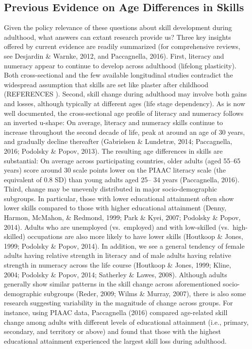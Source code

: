 \documentclass[
  english,
  man]{apa6}
\begin{document}
\hypertarget{previous-evidence-on-age-differences-in-skills}{%
\subsection{Previous Evidence on Age Differences in Skills}\label{previous-evidence-on-age-differences-in-skills}}

Given the policy relevance of these questions about skill development during adulthood, what answers can extant research provide us? Three key insights offered by current evidence are readily summarized (for comprehensive reviews, see Desjardin \& Warnke, 2012, and Paccagnella, 2016). First, literacy and numeracy appear to continue to develop across adulthood (lifelong plasticity). Both cross-sectional and the few available longitudinal studies contradict the widespread assumption that skills are set like plaster after childhood (REFERENCES ). Second, skill change during adulthood may involve both gains and losses, although typically at different ages (life stage dependency). As is now well documented, the cross-sectional age profile of literacy and numeracy follows an inverted u-shape: On average, literacy and numeracy skills continue to increase throughout the second decade of life, peak at around an age of 30 years, and gradually decline thereafter (Gabrielsen \& Lundetræ, 2014; Paccagnella, 2016; Podolsky \& Popov, 2013). The resulting age differences in skills are substantial: On average across participating countries, older adults (aged 55--65 years) score around 30 scale points lower on the PIAAC literacy scale (the equivalent of 0.8 SD) than young adults aged 25-- 34 years (Paccagnella, 2016). Third, change may be unevenly distributed in major socio-demographic subgroups. In particular, those with lower educational attainment often show lower skills compared to those with higher educational attainment (Denny, Harmon, McMahon, \& Redmond, 1999; Park \& Kyei, 2007; Podolsky \& Popov, 2014). Adults who are unemployed (vs.~employed) and with low-skilled (vs.~high-skilled) occupations are also more likely to have lower skills (Houtkoop \& Jones, 1999; Podolsky \& Popov, 2014). In addition, we see a general tendency of female adults having relative strength in literacy and of male adults having relative strength in numeracy across the life course (Houtkoop \& Jones, 1999; Kline, 2004; Podolsky \& Popov, 2014; Satherley \& Lawes, 2008). Although adults generally show similar patterns in the skill change across aforementioned socio-demographic subgroups (Reder, 2009; Wilms \& Murray, 2007), there is also some research suggesting variability in the magnitude of change across groups. For instance, using PIAAC data, Paccagnella (2016) compared age-related skill change among adults with different levels of educational attainment (i.e., primary, secondary, and territory or above) and found that those with the highest educational attainment experienced the largest skill loss during adulthood.\\
\end{document}
